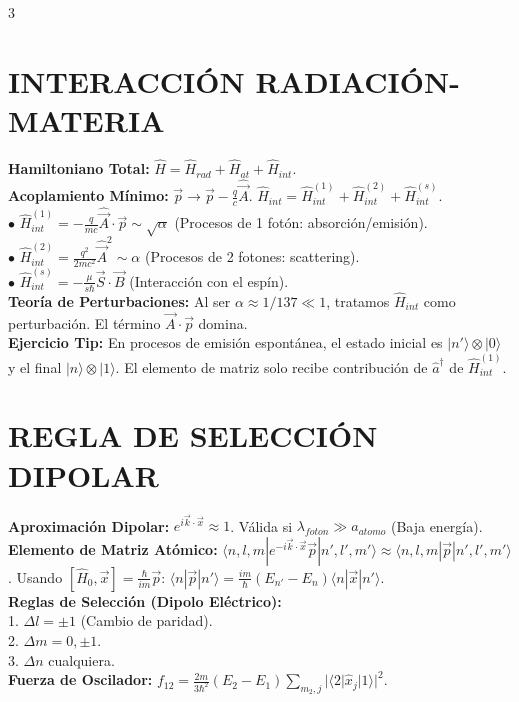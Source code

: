 \documentclass[8pt,a4paper,fleqn]{extarticle} %
\begin{document}
\begin{multicols}{3}
\section{INTERACCIÓN RADIACIÓN-MATERIA}
\textbf{Hamiltoniano Total:} $\hat{H} = \hat{H}_{rad} + \hat{H}_{at} + \hat{H}_{int}$.
\\\textbf{Acoplamiento Mínimo:} $\vec{p} \to \vec{p} - \frac{q}{c}\hat{\vec{A}}$.
$\hat{H}_{int} = \hat{H}_{int}^{(1)} + \hat{H}_{int}^{(2)} + \hat{H}_{int}^{(s)}$.
\\$\bullet$ $\hat{H}_{int}^{(1)} = -\frac{q}{mc} \hat{\vec{A}} \cdot \vec{p} \sim \sqrt{\alpha}$ (Procesos de 1 fotón: absorción/emisión).
\\$\bullet$ $\hat{H}_{int}^{(2)} = \frac{q^2}{2mc^2} \hat{\vec{A}}^2 \sim \alpha$ (Procesos de 2 fotones: scattering).
\\$\bullet$ $\hat{H}_{int}^{(s)} = -\frac{\mu}{s\hbar} \vec{S} \cdot \vec{B}$ (Interacción con el espín).
\\\textbf{Teoría de Perturbaciones:} Al ser $\alpha \approx 1/137 \ll 1$, tratamos $\hat{H}_{int}$ como perturbación. El término $\vec{A} \cdot \vec{p}$ domina.
\\\textbf{Ejercicio Tip:} En procesos de emisión espontánea, el estado inicial es $|n'\rangle \otimes |0\rangle$ y el final $|n\rangle \otimes |1\rangle$. El elemento de matriz solo recibe contribución de $\hat{a}^\dagger$ de $\hat{H}_{int}^{(1)}$.

\section{REGLA DE SELECCIÓN DIPOLAR}
\textbf{Aproximación Dipolar:} $e^{i\vec{k} \cdot \vec{x}} \approx 1$. Válida si $\lambda_{foton} \gg a_{atomo}$ (Baja energía).
\textbf{Elemento de Matriz Atómico:}
$\langle n, l, m | e^{-i\vec{k} \cdot \vec{x}} \vec{p} | n', l', m' \rangle \approx \langle n, l, m | \vec{p} | n', l', m' \rangle$.
Usando $[\hat{H}_0, \vec{x}] = \frac{\hbar}{im} \vec{p}$:
$\langle n | \vec{p} | n' \rangle = \frac{im}{\hbar}(E_{n'} - E_n) \langle n | \vec{x} | n' \rangle$.
\\\textbf{Reglas de Selección (Dipolo Eléctrico):}\\
1. $\Delta l = \pm 1$ (Cambio de paridad).\\
2. $\Delta m = 0, \pm 1$.\\
3. $\Delta n$ cualquiera.\\
\textbf{Fuerza de Oscilador:} $f_{12} = \frac{2m}{3\hbar^2}(E_2 - E_1) \sum_{m_2, j} |\langle 2 | \hat{x}_j | 1 \rangle|^2$.


\end{multicols}
\end{document}
